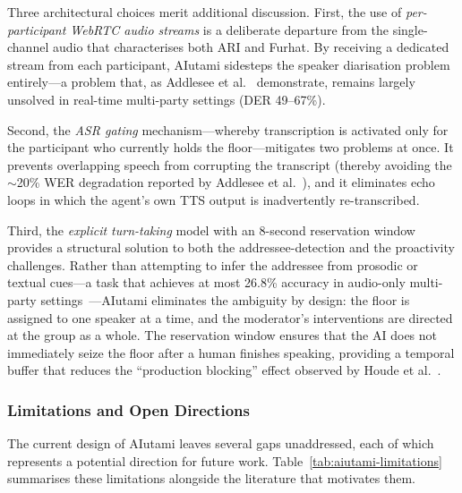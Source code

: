 Three architectural choices merit additional discussion.  First, the use of
\emph{per-participant WebRTC audio streams} is a deliberate departure from the
single-channel audio that characterises both ARI and Furhat.  By receiving a
dedicated stream from each participant, AIutami sidesteps the speaker
diarisation problem entirely---a problem that, as Addlesee et
al.~\cite{addlesee2020asr} demonstrate, remains largely unsolved in real-time
multi-party settings (DER 49--67\%).

Second, the \emph{ASR gating} mechanism---whereby transcription is activated
only for the participant who currently holds the floor---mitigates two problems
at once.  It prevents overlapping speech from corrupting the transcript (thereby
avoiding the ${\sim}$20\% WER degradation reported by Addlesee et
al.~\cite{addlesee2020asr}), and it eliminates echo loops in which the agent's
own TTS output is inadvertently re-transcribed.

Third, the \emph{explicit turn-taking} model with an 8-second reservation
window provides a structural solution to both the addressee-detection and the
proactivity challenges.  Rather than attempting to infer the addressee from
prosodic or textual cues---a task that achieves at most 26.8\% accuracy in
audio-only multi-party settings~\cite{axelsson2025furhat}---AIutami eliminates
the ambiguity by design: the floor is assigned to one speaker at a time, and
the moderator's interventions are directed at the group as a whole.  The
reservation window ensures that the AI does not immediately seize the floor
after a human finishes speaking, providing a temporal buffer that reduces the
``production blocking'' effect observed by Houde et
al.~\cite{houde2025koala}.

\subsubsection{Limitations and Open Directions}
\label{sssec:aiutami-limitations}

The current design of AIutami leaves several gaps unaddressed, each of which
represents a potential direction for future work.
Table~\ref{tab:aiutami-limitations} summarises these limitations alongside the
literature that motivates them.

